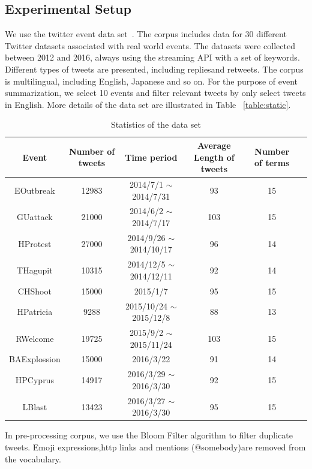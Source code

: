 \documentclass{llncs}
\begin{document}
\subsection{Experimental Setup}
We use the twitter event data set~\cite{}. The corpus includes data for 30 different Twitter datasets associated with real world events. The datasets were collected between 2012 and 2016, always using the streaming API with a set of keywords. Different types of tweets are presented, including repliesand retweets. The corpus is multilingual, including English, Japanese and so on. For the purpose of event summarization, we select 10 events and filter relevant tweets by only select tweets in English. More details of the data set are illustrated in Table ~\ref{table:static}.

\begin{table}[htp]\label{table:static}
\caption{Statistics of the data set}
\begin{center}
\begin{tabular}{|c|c|c|c|c|c|}
    \hline
    Event & Number of tweets & Time period & Average Length of tweets &  Number of terms\\
    \hline
    EOutbreak & 12983 & 2014/7/1 $\sim$ 2014/7/31 & 93 & 15 \\
    \hline
    GUattack & 21000 & 2014/6/2 $\sim$ 2014/7/17 & 103 & 15 \\
    \hline
    HProtest & 27000 & 2014/9/26 $\sim$ 2014/10/17 & 96 & 14 \\
    \hline
    THagupit & 10315 & 2014/12/5 $\sim$ 2014/12/11 & 92 & 14 \\
    \hline
    CHShoot & 15000 & 2015/1/7 & 95 & 15 \\
    \hline
    HPatricia & 9288 & 2015/10/24 $\sim$ 2015/12/8 & 88 & 13 \\
    \hline
    RWelcome & 19725 & 2015/9/2 $\sim$ 2015/11/24 & 103 & 15 \\
    \hline
    BAExplossion & 15000 & 2016/3/22 & 91 & 14 \\
    \hline
    HPCyprus & 14917 & 2016/3/29 $\sim$ 2016/3/30 & 92 & 15\\
    \hline
    LBlast & 13423 & 2016/3/27 $\sim$ 2016/3/30 & 95 & 15\\
    \hline
\end{tabular}
\end{center}
\label{default}
\end{table}

In pre-processing corpus, we use the Bloom Filter algorithm to filter duplicate tweets. Emoji expressions,http links and mentions (@somebody)are removed from the vocabulary.
\end{document}
